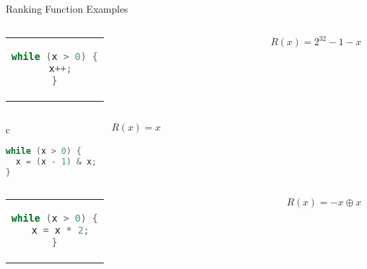 \documentclass[xcolor=pdftex,t,11pt]{beamer}
\begin{document}
\begin{frame}[fragile]{Ranking Function Examples}

\begin{center}
\begin{columns}[c]
  \begin{tabular}{c}
   \begin{lstlisting}[language=c,basicstyle=\normalsize]
while (x > 0) {
  x++;
}
   \end{lstlisting}
  \end{tabular}
 \pause
 $R(x) = 2^{32} - 1 - x$
\end{columns}
\end{center}

\pause

\begin{center}
\begin{columns}[c]
  \begin{tabular}{c}
   \begin{lstlisting}[language=c,basicstyle=\normalsize]
while (x > 0) {
  x = (x - 1) & x;
}
   \end{lstlisting}
  \end{tabular}
 \pause
 $R(x) = x$
\end{columns}
\end{center}

\pause

\begin{center}
\begin{columns}[c]
  \begin{tabular}{c}
   \begin{lstlisting}[language=c,basicstyle=\normalsize]
while (x > 0) {
  x = x * 2;
}
   \end{lstlisting}
  \end{tabular}
 \pause
 $R(x) = -x \oplus x$
\end{columns}
\end{center}


\end{frame}
\end{document}
